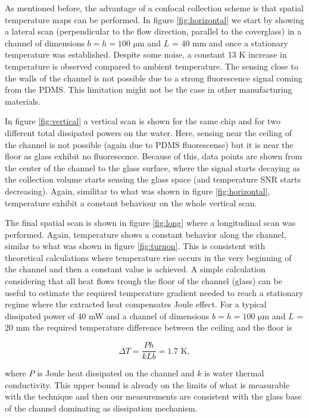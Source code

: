 \documentclass[twocolumn]{svjour3}       %
\begin{document}
As mentioned before, the advantage of a confocal collection scheme is that spatial temperature maps can be performed. In figure \ref{fig:horizontal} we start by showing a lateral scan (perpendicular to the flow direction, parallel to the coverglass) in a channel of dimensions $b = h = 100$ $\mathrm{\mu m}$ and $L$ = 40 mm and once a stationary temperature was established. Despite some noise, a constant 13 K increase in temperature is observed compared to ambient temperature. The sensing close to the walls of the channel is not possible due to a strong fluorescence signal coming from the PDMS. This limitation might not be the case in other manufacturing materials.

In figure \ref{fig:vertical} a vertical scan is shown for the same chip and for two different total dissipated powers on the water. Here, sensing near the ceiling of the channel is not possible (again due to PDMS fluorescense) but it is near the floor as glass exhibit no fluorescence. Because of this, data points are shown from the center of the channel to the glass surface, where the signal starts decaying as the collection volume starts sensing the glass space (and temperature SNR starts decreasing). Again, similitar to what was shown in figure \ref{fig:horizontal}, temperature exhibit a constant behaviour on the whole vertical scan.

The final spatial scan is shown in figure \ref{fig:long} where a longitudinal scan was performed. Again, temperature shows a constant behavior along the channel, similar to what was shown in figure \ref{fig:turnon}. This is consistent with theoretical calculations \cite{jouleteorico} where temperature rise occurs in the very beginning of the channel and then a constant value is achieved. A simple calculation considering that all heat flows trough the floor of the channel (glass) can be useful to estimate the required temperature gradient needed to reach a stationary regime where the extracted heat compensates Joule effect. For a typical dissipated power of 40 mW and a channel of dimensions $b = h = 100$ $\mathrm{\mu m}$ and $L$ = 20 mm the required temperature difference between the ceiling and the floor is 

\begin{equation}
\Delta T = \frac{Ph}{kLb} = 1.7\,\, \mathrm{K},
\end{equation}

where $P$ is Joule heat dissipated on the channel and $k$ is water thermal conductivity. This upper bound is already on the limits of what is measurable with the technique and then our measurements are consistent with the glass base of the channel dominating as dissipation mechanism. 
\end{document}
